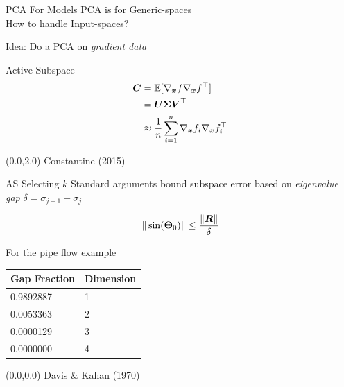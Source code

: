 \documentclass[14pt]{beamer}
\begin{document}
\begin{frame}{PCA For Models}
  PCA is for Generic-spaces \\
  How to handle Input-spaces?

  \bigskip Idea: Do a PCA on \emph{gradient data}
\end{frame}


\begin{frame}{Active Subspace}
  \begin{equation*} \begin{aligned}
      \boldsymbol{C} &= \mathbb{E}[\nabla_{\boldsymbol{x}}f\nabla_{\boldsymbol{x}}f^{\top}] \\
          &= \boldsymbol{U}\boldsymbol{\Sigma}\boldsymbol{V}^{\top} \\
          &\approx \frac{1}{n}\sum_{i=1}^n \nabla_{\boldsymbol{x}}f_i\nabla_{\boldsymbol{x}}f^{\top}_i
  \end{aligned} \end{equation*}

  \begin{textblock}{5}(0.0,2.0)
    {\tiny Constantine (2015)}
  \end{textblock}
\end{frame}

\begin{frame}{AS Selecting $k$}
  Standard arguments bound subspace error based on \emph{eigenvalue gap} $\delta
  = \sigma_{j+1} - \sigma_j$

  \begin{equation*}
    \|\sin(\boldsymbol{\Theta}_0)\| \leq \frac{\|\boldsymbol{R}\|}{\delta}
  \end{equation*}

  For the pipe flow example
  \begin{table}
    \centering
    \begin{tabular}{@{}ll@{}}
      \hline
      Gap Fraction & Dimension\\
      \hline
      0.9892887 & 1\\
      \hline
      0.0053363 & 2\\
      \hline
      0.0000129 & 3\\
      \hline
      0.0000000 & 4\\
      \hline
    \end{tabular}
  \end{table}

  \begin{textblock}{5}(0.0,0.0)
    {\tiny Davis \& Kahan (1970)}
  \end{textblock}
\end{frame}
\end{document}
